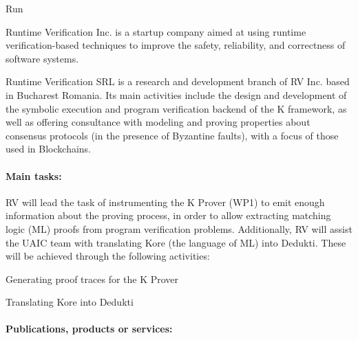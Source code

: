 \begin{sitedescription}{Run}



Runtime Verification Inc. is a startup company aimed at using runtime verification-based
techniques to improve the safety, reliability, and correctness of software systems.

Runtime Verification SRL is a research and development branch of RV Inc. based
in Bucharest Romania.  Its main activities include the design and development of
the symbolic execution and program verification backend of the K framework,
as well as offering consultance with modeling and proving properties about
consensus protocols (in the presence of Byzantine faults),
with a focus of those used in Blockchains.

\paragraph{Main tasks:}


RV will lead the task of instrumenting the K Prover (WP1) to emit enough information
about the proving process, in order to allow extracting matching logic (ML) proofs from
program verification problems.  Additionally, RV will assist the UAIC team with
translating Kore (the language of ML) into Dedukti.
These will be achieved through the following activities:


\begin{compactitem}
\item Generating proof traces for the K Prover
\item Translating Kore into Dedukti 
\end{compactitem}

\paragraph{Publications, products or services:}



\end{sitedescription}
